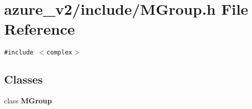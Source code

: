 \section{azure\_\-v2/include/MGroup.h File Reference}
\label{MGroup_8h}
{\tt \#include $<$complex$>$}\par
\subsection*{Classes}
\begin{CompactItemize}
\item 
class \bf{MGroup}
\end{CompactItemize}
